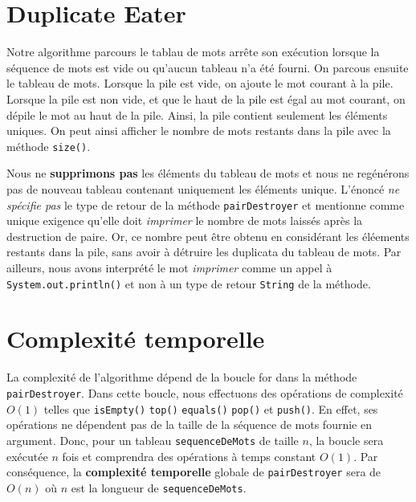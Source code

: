 \documentclass[10pt]{report}
\begin{document}
    \section{Duplicate    Eater}
        Notre algorithme parcours le tablau de mots arrête son exécution 
        lorsque la séquence de mots est vide ou qu'aucun tableau n'a été fourni. 
        On parcous ensuite le tableau de mots. Lorsque la pile est vide, on ajoute 
        le mot courant à la pile. Lorsque la pile est non vide, et que le haut de la pile 
        est égal au mot courant, on dépile le mot au haut de la pile. 
        Ainsi, la pile contient seulement les éléments uniques. On peut ainsi afficher le 
        nombre de mots restants dans la pile avec la méthode \texttt{size()}.   


    \begin{note}{}{}
        Nous ne \textbf{supprimons pas} les éléments du tableau de mots et nous 
        ne regénérons pas de nouveau tableau contenant uniquement les éléments unique. 
        L'énoncé \textit{ne spécifie pas} le type de retour de la méthode 
        \texttt{pairDestroyer} et mentionne comme unique exigence qu'elle doit 
        \textit{imprimer} 
        le nombre de mots laissés après la destruction de paire. 
        Or, ce nombre peut être obtenu en considérant les éléements restants 
        dans la pile, sans avoir à détruire les duplicata du tableau de mots. 
        Par ailleurs, nous avons interprété le mot \textit{imprimer} comme 
        un appel à \texttt{System.out.println()} et non à un type de retour \texttt{String}      
        de la méthode. 
    \end{note}            

    
    \section{Complexité temporelle}
        La complexité de l'algorithme dépend de la boucle for dans la méthode 
        \texttt{pairDestroyer}. Dans cette boucle, nous effectuons des opérations 
        de complexité $O(1)$ telles que \texttt{isEmpty()} \texttt{top()} \texttt{equals()}      
        \texttt{pop()} et \texttt{push()}. En effet, ses opérations ne dépendent pas 
        de la taille de la séquence de mots fournie en argument. Donc, pour un tableau 
        \texttt{sequenceDeMots} de taille $n$, la boucle sera exécutée $n$ fois 
        et comprendra des opérations à temps constant $O(1)$. Par conséquence, 
        la \textbf{complexité temporelle} globale de \texttt{pairDestroyer} sera 
        de $O(n)$ où $n$ est la longueur de \texttt{sequenceDeMots}. 
\end{document}
